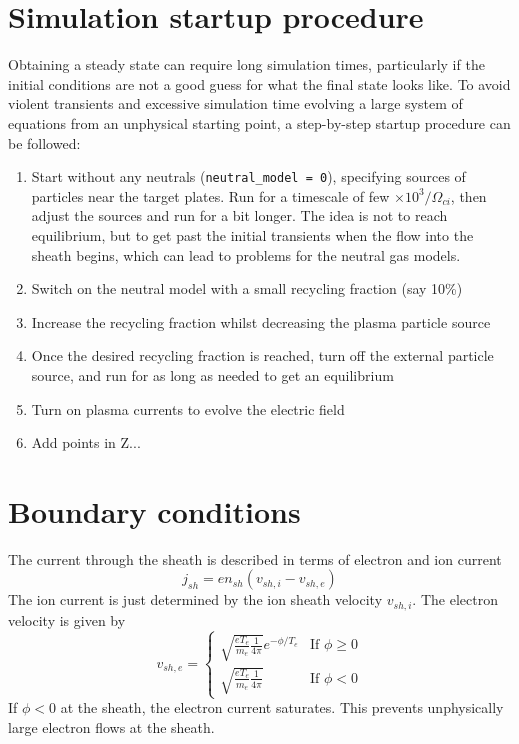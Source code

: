 \documentclass[12pt,a4paper]{article}
\begin{document}
\section{Simulation startup procedure}

Obtaining a steady state can require long simulation times, particularly if the initial conditions are not a good
guess for what the final state looks like. To avoid violent transients and excessive simulation time evolving
a large system of equations from an unphysical starting point, a step-by-step startup procedure can be followed:
\begin{enumerate}
\item Start without any neutrals (\texttt{neutral\_model = 0}), specifying sources of particles near the target plates.
  Run for a timescale of few $\times 10^3 / \Omega_{ci}$, then adjust the sources and run for a bit longer. The idea
  is not to reach equilibrium, but to get past the initial transients when the flow into the sheath begins, which can
  lead to problems for the neutral gas models.
\item Switch on the neutral model with a small recycling fraction (say 10\%)
\item Increase the recycling fraction whilst decreasing the plasma particle source
\item Once the desired recycling fraction is reached, turn off the external particle source,
  and run for as long as needed to get an equilibrium
\item Turn on plasma currents to evolve the electric field
\item Add points in Z...
\end{enumerate}

\section{Boundary conditions}
\label{sec:boundary}

The current through the sheath is described in terms of electron and ion current
\[
j_{sh} = en_{sh}\left(v_{sh,i} - v_{sh,e}\right)
\]
The ion current is just determined by the ion sheath velocity $v_{sh,i}$.
The electron velocity is given by
\begin{equation}
v_{sh,e} = \left\{\begin{array}{ll}
  \sqrt{\frac{eT_e}{m_e}\frac{1}{4\pi}}e^{-\phi/T_e} & \textrm{If $\phi \ge 0$} \\
  \sqrt{\frac{eT_e}{m_e}\frac{1}{4\pi}} & \textrm{If $\phi < 0$}
\end{array}\right.
\end{equation}
If $\phi < 0$ at the sheath, the electron current saturates. This
prevents unphysically large electron flows at the sheath.
\end{document}
